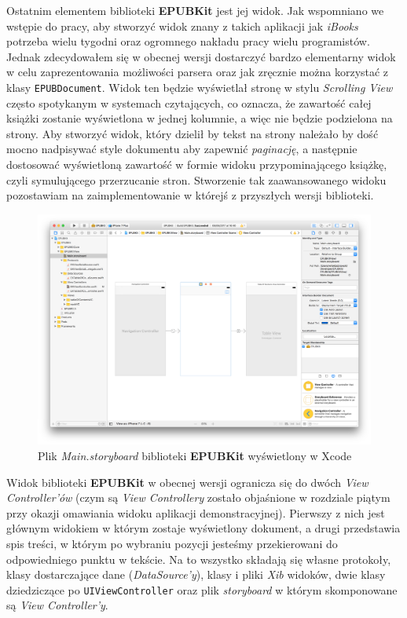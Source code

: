 Ostatnim elementem biblioteki \textbf{EPUBKit} jest jej widok. Jak wspomniano we wstępie do pracy, aby stworzyć widok znany z takich aplikacji jak \textit{iBooks} potrzeba wielu tygodni oraz ogromnego nakładu pracy wielu programistów. Jednak zdecydowałem się w obecnej wersji dostarczyć bardzo elementarny widok w celu zaprezentowania możliwości parsera oraz jak zręcznie można korzystać z klasy \texttt{EPUBDocument}. Widok ten będzie wyświetlał stronę w stylu \textit{Scrolling View} często spotykanym w systemach czytających, co oznacza, że zawartość całej książki zostanie wyświetlona w jednej kolumnie, a więc nie będzie podzielona na strony. Aby stworzyć widok, który dzielił by tekst na strony należało by dość mocno nadpisywać style dokumentu aby zapewnić \textit{paginację}, a następnie dostosować wyświetloną zawartość w formie widoku przypominającego książkę, czyli symulującego przerzucanie stron. Stworzenie tak zaawansowanego widoku pozostawiam na zaimplementowanie w którejś z przyszłych wersji biblioteki.

\begin{figure}[ht!]
  \centering
  \includegraphics[width=120mm]{images/chapter-4-image-3-epubkit-storyboard.png}
  \caption{Plik \textit{Main.storyboard} biblioteki \textbf{EPUBKit} wyświetlony w Xcode}
  \label{chapter-4-image-3-epubkit-storyboard}
\end{figure}

Widok biblioteki \textbf{EPUBKit} w obecnej wersji ogranicza się do dwóch \textit{View Controller’ów} (czym są \textit{View Controllery} zostało objaśnione w rozdziale piątym przy okazji omawiania widoku aplikacji demonstracyjnej). Pierwszy z nich jest głównym widokiem w którym zostaje wyświetlony dokument, a drugi przedstawia spis treści, w którym po wybraniu pozycji jesteśmy przekierowani do odpowiedniego punktu w tekście. Na to wszystko składają się własne protokoły, klasy dostarczające dane (\textit{DataSource'y}), klasy i pliki \textit{Xib} widoków, dwie klasy dziedziczące po \texttt{UIViewController} oraz plik \textit{storyboard} w którym skomponowane są \textit{View Controller’y}.

